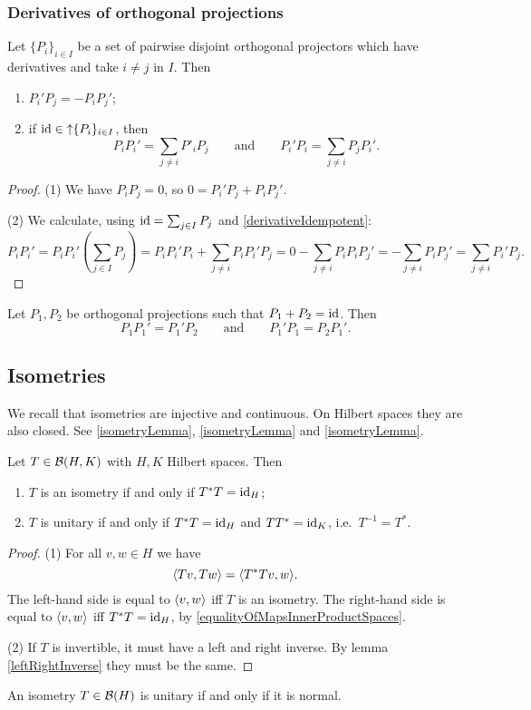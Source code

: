 \subsubsection{Derivatives of orthogonal projections}



\begin{proposition}
Let $\{P_i\}_{i\in I}$ be a set of pairwise disjoint orthogonal projectors which have derivatives and take $i\neq j$ in $I$. Then
\begin{enumerate}
\item $P_i'P_j = - P_iP_j'$;
\item if $\operatorname{id} \in \operatorname{\uparrow} \{P_i\}_{i\in I}$, then
\[ P_iP_i' = \sum_{j\neq i}P'_iP_j \qquad\text{and}\qquad P_i'P_i = \sum_{j\neq i}P_jP_i'. \]
\end{enumerate}
\end{proposition}
\begin{proof}
(1) We have $P_iP_j = 0$, so $0 = P_i'P_j + P_iP_j'$.

(2) We calculate, using $\operatorname{id} = \sum_{j\in I}P_j$ and \ref{derivativeIdempotent}:
\[ P_iP_i' = P_iP_i'\left(\sum_{j\in I}P_j\right) = P_iP_i'P_i + \sum_{j\neq i}P_iP_i'P_j = 0 - \sum_{j\neq i}P_iP_iP_j' = -\sum_{j\neq i}P_iP_j' = \sum_{j\neq i}P_i'P_j. \]
\end{proof}
\begin{corollary}
Let $P_1, P_2$ be orthogonal projections such that $P_1 + P_2 = \operatorname{id}$. Then
\[ P_1P_1'= P_1'P_2 \qquad \text{and}\qquad P_1'P_1 = P_2P_1'. \]
\end{corollary}


\subsection{Isometries}
We recall that isometries are injective and continuous. On Hilbert spaces they are also closed. See \ref{isometryLemma}, \ref{isometryLemma} and \ref{isometryLemma}.

\begin{proposition} \label{isometryCharacterisation}
Let $T\in \operatorname{\mathcal{B}}(H,K)$ with $H,K$ Hilbert spaces. Then
\begin{enumerate}
\item $T$ is an isometry \textup{if and only if} $T^*T = \operatorname{id}_H$;
\item $T$ is unitary \textup{if and only if} $T^*T = \operatorname{id}_H$ and $TT^* = \operatorname{id}_K$, i.e.\ $T^{-1} = T^*$.
\end{enumerate}
\end{proposition}
\begin{proof}
(1) For all $v,w\in H$ we have
\[ \inner{Tv,Tw} = \inner{T^*Tv,w}. \]
The left-hand side is equal to $\inner{v,w}$ iff $T$ is an isometry. The right-hand side is equal to $\inner{v,w}$ iff $T^*T = \operatorname{id}_H$, by \ref{equalityOfMapsInnerProductSpaces}.

(2) If $T$ is invertible, it must have a left and right inverse. By lemma \ref{leftRightInverse} they must be the same.
\end{proof}
\begin{corollary}
An isometry $T\in\operatorname{\mathcal{B}}(H)$ is unitary \textup{if and only if} it is normal.
\end{corollary}

